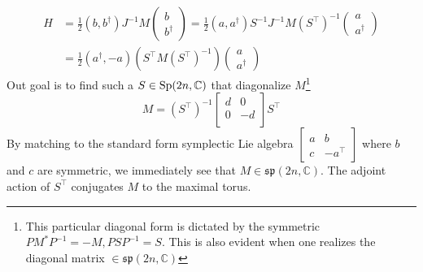 \begin{equation}
\begin{aligned}
H &= \frac{1}{2} ( b,  b^{\dagger} ) J^{-1} M 
\begin{pmatrix}
b\\
b^{\dagger} 
\end{pmatrix}
 = \frac{1}{2} ( a,  a^{\dagger} ) S^{-1} J^{-1} M (S^{\top})^{-1} 
\begin{pmatrix}
a\\
a^{\dagger} 
\end{pmatrix}\\
& = \frac{1}{2} ( a^{\dagger}, -a )  (S^{\top} M (S^{\top})^{-1} )
\begin{pmatrix}
a\\
a^{\dagger} 
\end{pmatrix}
\end{aligned}
\end{equation}
Out goal is to find such a $S \in {\rm Sp}( 2n, \mathbb{C} )$ that diagonalize $M$\footnote{This particular diagonal form is dictated by the symmetric $P M^* P^{-1} = -M, P S P^{-1} = S $. This is also evident when one realizes the diagonal matrix $\in \mathfrak{sp}(2n, \mathbb{C} )$}
\begin{equation}
M = (S^{\top})^{-1} 
  \begin{bmatrix}
    d & 0\\
    0 & -d \\
  \end{bmatrix} S^{\top}  
\end{equation}
By matching to the standard form symplectic Lie algebra $\begin{bmatrix} a & b \\ c & -a^{\top} \end{bmatrix}$ where $b$ and $c$ are symmetric, we immediately see that $M \in \mathfrak{sp}( 2n, \mathbb{C} ) $. The adjoint action of $S^{\top}$ conjugates $M$ to the maximal torus. 

